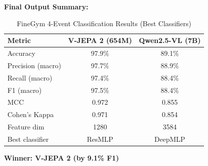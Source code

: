 \documentclass[a4paper, 12pt]{article}
\begin{document}
\textbf{Final Output Summary:}

\begin{table}[H]
\centering
\begin{tabular}{lcc}
\toprule
\textbf{Metric} & \textbf{V-JEPA 2 (654M)} & \textbf{Qwen2.5-VL (7B)} \\
\midrule
Accuracy            & 97.9\% & 89.1\% \\
Precision (macro)   & 97.7\% & 88.9\% \\
Recall (macro)      & 97.4\% & 88.4\% \\
F1 (macro)          & 97.5\% & 88.4\% \\
MCC                 & 0.972   & 0.855  \\
Cohen's Kappa       & 0.971   & 0.854  \\
\midrule
Feature dim         & 1280    & 3584   \\
Best classifier     & ResMLP  & DeepMLP \\
\bottomrule
\end{tabular}
\caption{FineGym 4-Event Classification Results (Best Classifiers)}
\end{table}

\textbf{Winner: V-JEPA 2 (by 9.1\% F1)}
\end{document}
